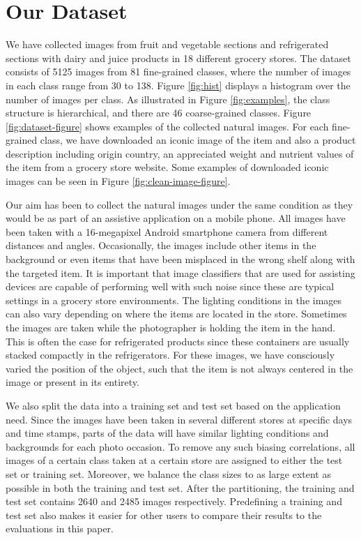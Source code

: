 \section{Our Dataset}\label{sec:our-dataset}

We have collected images from fruit and vegetable sections and refrigerated sections with dairy and juice products in 18 different grocery stores. The dataset consists of 5125 images from 81 fine-grained classes, where the number of images in each class range from 30 to 138. Figure \ref{fig:hist} displays a histogram over the number of images per class. As illustrated in Figure \ref{fig:examples}, the class structure is hierarchical, and there are 46 coarse-grained classes. Figure \ref{fig:dataset-figure} shows examples of the collected natural images. For each fine-grained class, we have downloaded an iconic image of the item and also a product description including origin country, an appreciated weight and nutrient values of the item from a grocery store website. Some examples of downloaded iconic images can be seen in Figure \ref{fig:clean-image-figure}. 

Our aim has been to collect the natural images under the same condition as they would be as part of an assistive application on a mobile phone. All images have been taken with a 16-megapixel Android smartphone camera from different distances and angles. Occasionally, the images include other items in the background or even items that have been misplaced in the wrong shelf along with the targeted item. It is important that image classifiers that are used for assisting devices are capable of performing well with such noise since these are typical settings in a grocery store environments. The lighting conditions in the images can also vary depending on where the items are located in the store. 
Sometimes the images are taken while the photographer is holding the item in the hand. This is often the case for refrigerated products since these containers are usually stacked compactly in the refrigerators. For these images, we have consciously varied the position of the object, such that the item is not always centered in the image or present in its entirety. 

We also split the data into a training set and test set based on the application need. Since the images have been taken in several different stores at specific days and time stamps, 
parts of the data will have similar lighting conditions and backgrounds for each photo occasion. To remove any such biasing correlations, all images of a certain class taken at a certain store are assigned to either the test set or training set. Moreover, we balance the class sizes to as large extent as possible in both the training and test set. After the partitioning, the training and test set contains 2640 and 2485 images respectively. Predefining a training and test set also makes it easier for other users to compare their results to the evaluations in this paper.

